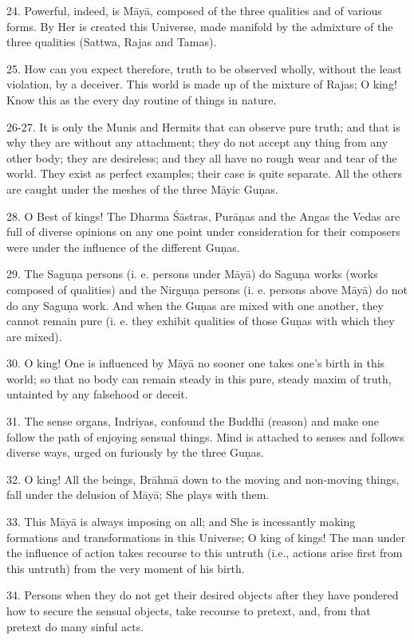 24. Powerful, indeed, is M\=ay\=a, composed of the three qualities and of various forms. By Her is created this Universe, made manifold by the admixture of the three qualities (Sattwa, Rajas and Tamas).

25. How can you expect therefore, truth to be observed wholly, without the least violation, by a deceiver. This world is made up of the mixture of Rajas; O king! Know this as the every day routine of things in nature.

26-27. It is only the Munis and Hermits that can observe pure truth; and that is why they are without any attachment; they do not accept any thing from any other body; they are desireless; and they all have no rough wear and tear of the world. They exist as perfect examples; their case is quite separate. All the others are caught under the meshes of the three M\=ayic Gu\d{n}as.

28. O Best of kings! The Dharma \'S\=astras, Pur\=a\d{n}as and the Angas the Vedas are full of diverse opinions on any one point under consideration for their composers were under the influence of the different Gu\d{n}as.

29. The Sagu\d{n}a persons (i. e. persons under M\=ay\=a) do Sagu\d{n}a works (works composed of qualities) and the Nirgu\d{n}a persons (i. e. persons above M\=ay\=a) do not do any Sagu\d{n}a work. And when the Gu\d{n}as are mixed with one another, they cannot remain pure (i. e. they exhibit qualities of those Gu\d{n}as with which they are mixed).

30. O king! One is influenced by M\=ay\=a no sooner one takes one's birth in this world; so that no body can remain steady in this pure, steady maxim of truth, untainted by any falsehood or deceit.

31. The sense organs, Indriyas, confound the Buddhi (reason) and make one follow the path of enjoying sensual things. Mind is attached to senses and follows diverse ways, urged on furiously by the three Gu\d{n}as.

32. O king! All the beings, Br\=ahm\=a down to the moving and non-moving things, fall under the delusion of M\=ay\=a; She plays with them.

33. This M\=ay\=a is always imposing on all; and She is incessantly making formations and transformations in this Universe; O king of kings! The man under the influence of action takes recourse to this untruth (i.e., actions arise first from this untruth) from the very moment of his birth.

34. Persons when they do not get their desired objects after they have pondered how to secure the sensual objects, take recourse to pretext, and, from that pretext do many sinful acts.

